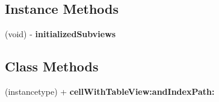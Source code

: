\subsection*{Instance Methods}
\begin{DoxyCompactItemize}
\item 
\mbox{\label{interface_f_n_h_sec_kill_public_cell_acccbf8fa2e3416d9b10e220c4e8fc15d}} 
(void) -\/ {\bfseries initialized\+Subviews}
\end{DoxyCompactItemize}
\subsection*{Class Methods}
\begin{DoxyCompactItemize}
\item 
\mbox{\label{interface_f_n_h_sec_kill_public_cell_a6965693133e19bfe80985b1b057042be}} 
(instancetype) + {\bfseries cell\+With\+Table\+View\+:and\+Index\+Path\+:}
\end{DoxyCompactItemize}
